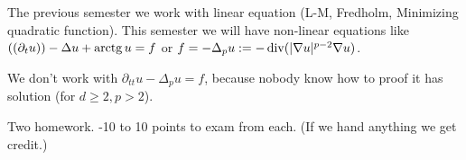 \documentclass[12pt]{article}					%
\begin{document}

\begin{poznamka}
	The previous semester we work with linear equation (L-M, Fredholm, Minimizing quadratic function). This semester we will have non-linear equations like $((\partial_t u)) - \Delta u + \operatorname{arctg} u = f$ or $f = -\Delta_p u := -\operatorname{div} (|\nabla u|^{p - 2} \nabla u)$.

	We don't work with $\partial_{t t} u - \Delta_p u = f$, because nobody know how to proof it has solution (for $d ≥ 2, p > 2$).
\end{poznamka}

\begin{poznamka}[Credit]
	Two homework. -10 to 10 points to exam from each. (If we hand anything we get credit.)
\end{poznamka}
\end{document}
